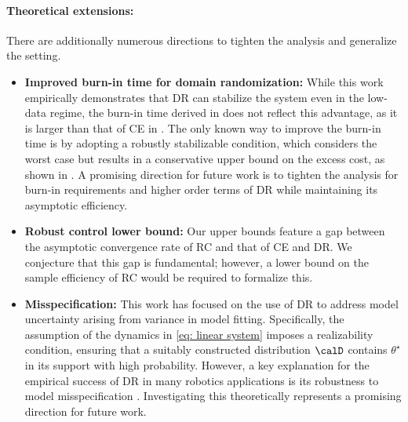 \paragraph{Theoretical extensions: } There are additionally numerous directions to tighten the analysis and generalize the setting. %
\begin{itemize}[noitemsep,nolistsep,leftmargin=*]
    \item \textbf{Improved burn-in time for domain randomization: }
    While this work empirically demonstrates that DR can stabilize the system even in the low-data regime, the burn-in time derived in  does not reflect this advantage, as it is larger than  that of CE in . The only known way to improve the burn-in time is by adopting a robustly stabilizable condition, which considers the worst case but results in a conservative upper bound on the excess cost, as shown in . A promising direction for future work is to tighten the analysis for burn-in requirements and higher order terms of DR while maintaining its asymptotic efficiency.
    \item \textbf{Robust control lower bound:} Our upper bounds feature a gap between the asymptotic convergence rate of RC and that of CE and DR. We conjecture that this gap is fundamental; however, a lower bound on the sample efficiency of RC would be required to formalize this.
    \item \textbf{Misspecification:}  This work has focused on the use of DR to address model uncertainty arising from variance in model fitting. Specifically, the assumption of the dynamics in \eqref{eq: linear system} imposes a realizability condition, ensuring that a suitably constructed distribution $\calD$ contains $\theta^\star$ in its support with high probability. However, a key explanation for the empirical success of DR in many robotics applications is its robustness to model misspecification \citep{tobin2017dr}. Investigating this theoretically represents a promising direction for future work.
\end{itemize}

